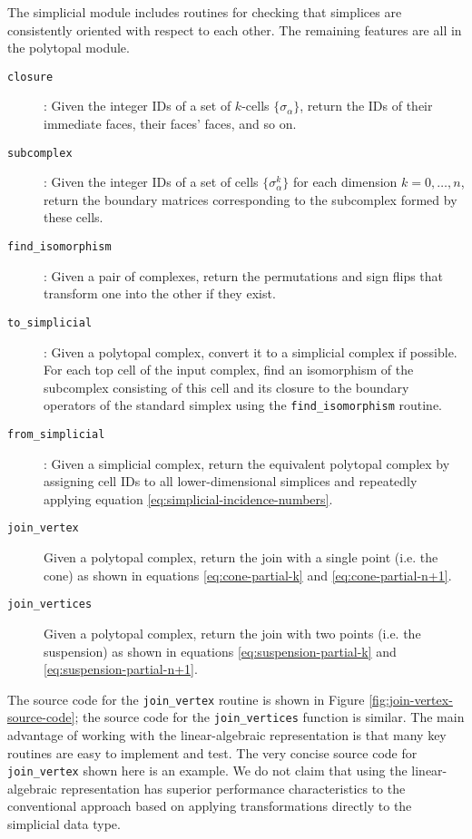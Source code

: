 \documentclass[twocolumn]{article}
\begin{document}
The simplicial module includes routines for checking that simplices are consistently oriented with respect to each other.
The remaining features are all in the polytopal module.
\begin{description}
    \item[\texttt{closure}]: Given the integer IDs of a set of $k$-cells $\{\sigma_\alpha\}$, return the IDs of their immediate faces, their faces' faces, and so on.
    \item[\texttt{subcomplex}]: Given the integer IDs of a set of cells $\{\sigma_\alpha^k\}$ for each dimension $k = 0,\ldots,n$, return the boundary matrices corresponding to the subcomplex formed by these cells.
    \item[\texttt{find\_isomorphism}]: Given a pair of complexes, return the permutations and sign flips that transform one into the other if they exist.
    \item[\texttt{to\_simplicial}]: Given a polytopal complex, convert it to a simplicial complex if possible.
        For each top cell of the input complex, find an isomorphism of the subcomplex consisting of this cell and its closure to the boundary operators of the standard simplex using the \texttt{find\_isomorphism} routine.
    \item[\texttt{from\_simplicial}]: Given a simplicial complex, return the equivalent polytopal complex by assigning cell IDs to all lower-dimensional simplices and repeatedly applying equation \eqref{eq:simplicial-incidence-numbers}.
    \item[\texttt{join\_vertex}] Given a polytopal complex, return the join with a single point (i.e. the cone) as shown in equations \eqref{eq:cone-partial-k} and \eqref{eq:cone-partial-n+1}.
    \item[\texttt{join\_vertices}] Given a polytopal complex, return the join with two points (i.e. the suspension) as shown in equations \eqref{eq:suspension-partial-k} and \eqref{eq:suspension-partial-n+1}.
\end{description}
The source code for the \texttt{join\_vertex} routine is shown in Figure \ref{fig:join-vertex-source-code}; the source code for the \texttt{join\_vertices} function is similar.
The main advantage of working with the linear-algebraic representation is that many key routines are easy to implement and test.
The very concise source code for \texttt{join\_vertex} shown here is an example.
We do not claim that using the linear-algebraic representation has superior performance characteristics to the conventional approach based on applying transformations directly to the simplicial data type.
\end{document}
